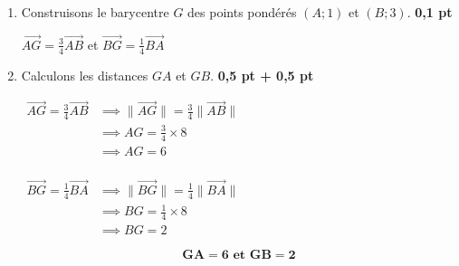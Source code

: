 \documentclass[12pt,a4paper]{article}
\begin{document}
\begin{enumerate}
    \item Construisons le barycentre \( G \) des points pondérés \( (A; 1) \) et \( (B; 3) \). \hfill \textbf{0{,}1 pt}

    \( \overrightarrow{AG} =\frac{3}{4}\overrightarrow{AB} \) et \( \overrightarrow{BG} =\frac{1}{4}\overrightarrow{BA} \)

\begin{center}
\end{center}


    \item Calculons les distances \( GA \) et \( GB \). \hfill \textbf{0{,}5 pt + 0{,}5 pt}

\( 
        \begin{aligned}
                \overrightarrow{AG} =\frac{3}{4}\overrightarrow{AB} &\implies \| \overrightarrow{AG}\| =\frac{3}{4}\|\overrightarrow{AB}\| \\
                                                                    &\implies AG =\frac{3}{4}\times8\\
                                                                    &\implies AG =6\\
        \end{aligned} 
    \)

    \( 
        \begin{aligned}
                \overrightarrow{BG} =\frac{1}{4}\overrightarrow{BA} &\implies \| \overrightarrow{BG}\| =\frac{1}{4}\|\overrightarrow{BA}\| \\
                                                                    &\implies BG =\frac{1}{4}\times8\\
                                                                    &\implies BG =2
        \end{aligned} 
    \)
        \begin{resultbox}
            \[
                \mathbf{GA =6 \text{ et } GB =2}
            \]
		\end{resultbox}
    

\end{enumerate}
\end{document}
